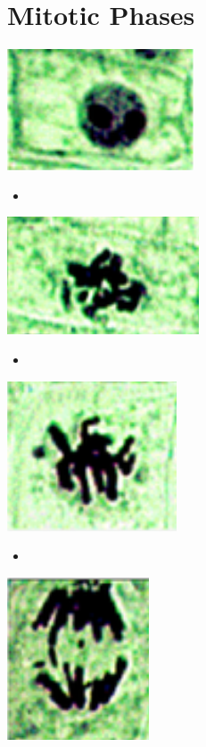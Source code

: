   \section{Mitotic Phases}
  \begin{center}
    \includegraphics[scale=0.5]{images/week-1-mp1.png}
  \end{center}
  \begin{itemize}
    \item 
  \end{itemize}
  \begin{center}
    \includegraphics[scale=0.5]{images/week-1-mp2.png}
  \end{center}
  \begin{itemize}
    \item 
  \end{itemize}
  \begin{center}
    \includegraphics[scale=0.5]{images/week-1-mp3.png}
  \end{center}
  \begin{itemize}
    \item 
  \end{itemize}
  \begin{center}
    \includegraphics[scale=0.5]{images/week-1-mp4.png}
  \end{center}
